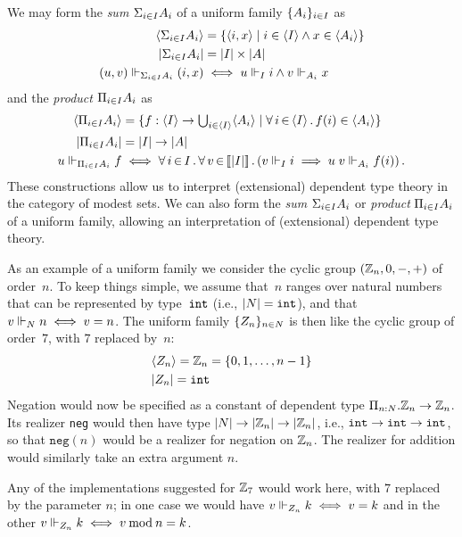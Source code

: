\iflong
We may form the \emph{sum} ${\Sigma_{i \in I} A_i}$ of a uniform family
$\{A_i\}_{i \in I}$ as
%
\begin{align*}
  \langle {\Sigma_{i \in I} A_i} \rangle &=
  \{\langle i,x \rangle \mid i \in \langle I \rangle \land x \in \langle A_i \rangle\}
  \\
  |{\Sigma_{i \in I} A_i}| &=
  |I| \times |A|
  \\
  (u,v) \Vdash_{{\Sigma_{i \in I} A_i}} (i,x)
  &\iff
  u \Vdash_I i \land v \Vdash_{A_i} x
\end{align*}
%
and the \emph{product} ${\Pi_{i \in I} A_i}$ as
%
\begin{align*}
  \langle {\Pi_{i \in I} A_i} \rangle &=
  \{f : \langle I \rangle \to {\textstyle \bigcup_{i \in \langle I \rangle} \langle A_i \rangle} \mid
    \forall\, i \,{\in}\, \langle I \rangle\,.\,f(i) \in \langle A_i \rangle\}
  \\
  |{\Pi_{i \in I} A_i}| &=
  |I| \to |A|
  \\
  u \Vdash_{{\Pi_{i \in I} A_i}} f
  &\iff
  \forall\, i \,{\in}\, I\,.\,\forall\, v \,{\in}\, [\![|I|]\!]\,.\left(
      v \Vdash_I i \implies
      u \; v \Vdash_{A_i} f(i)
    \right).
\end{align*}
%
These constructions allow us to interpret (extensional) dependent type
theory in the category of modest sets.
\else %
We can also form the \emph{sum} ${\Sigma_{i \in I} A_i}$ or
\emph{product} ${\Pi_{i \in I} A_i}$ of
a uniform family, allowing an interpretation of (extensional) dependent type
theory.
\fi %

\iflong
As an example of a uniform family we consider the cyclic group
$(\mathbb{Z}_n, 0, {-}, {+})$ of order~$n$. To keep things simple, we assume
that~$n$ ranges over natural numbers that can be represented by
type~$\mathtt{int}$ (i.e., $|N|=\mathtt{int}$), and that 
$v \Vdash_N n \iff v = n$.
%
The uniform family $\{Z_n\}_{n \in N}$ is then like the cyclic group of order~$7$, with $7$ replaced by~$n$:
%
\begin{align*}
  & \langle Z_n \rangle = \mathbb{Z}_n = \{0, 1, \ldots, n - 1\}
  \\
  & |Z_n| = \mathtt{int}
\end{align*}
%
Negation would now be specified as a constant of dependent type
$\Pi_{n{:}N}. \mathbb{Z}_n\to\mathbb{Z}_n$.  Its realizer \texttt{neg}
would then have type $|N|\to|\mathbb{Z}_n|\to{|\mathbb{Z}_n|}$,
i.e., $\mathtt{int}\to\mathtt{int}\to\mathtt{int}$, so that $\mathtt{neg}(n)$ would
be a realizer for negation on $\mathbb{Z}_n$.   The realizer for addition would
similarly take an extra argument $n$.  

Any of the implementations suggested for $\mathbb{Z}_7$ would work here, with
$7$ replaced by the parameter $n$; in one case we would have
$v \Vdash_{Z_n} k \iff v = k$ and in the other
$v \Vdash_{Z_n} k \iff v \mathbin{\mathrm{mod}} n = k$.
\fi %


